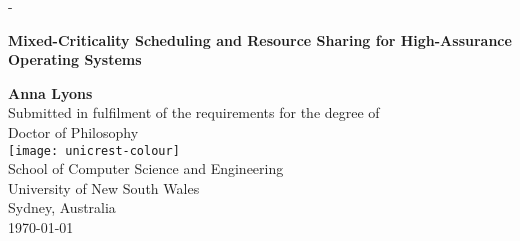
\frontmatter
\thispagestyle{empty}
\calccentering{\unitlength}                         %
\begin{adjustwidth*}{\unitlength}{-\unitlength}     %
    \begin{adjustwidth}{-1cm}{-1cm}                 %

\mbox{}
\vfill
\begin{center}
    {\Huge\sffamily\bfseries Mixed-Criticality Scheduling and Resource Sharing for High-Assurance Operating Systems\\[1cm]\par}
{\Large\sffamily\bfseries Anna Lyons}\\[1.5cm]
Submitted in fulfilment of the requirements for the degree of \\
Doctor of Philosophy\\[1cm]
\texttt{[image: unicrest-colour]} \\[1cm]
School of Computer Science and Engineering \\[0.5cm]
University of New South Wales \\[0.5cm]
Sydney, Australia \\[1.0cm]
\monthyear\today
\end{center}
\par
\vfill

\end{adjustwidth}
\end{adjustwidth*}

\cleardoublepage

%

%

%
